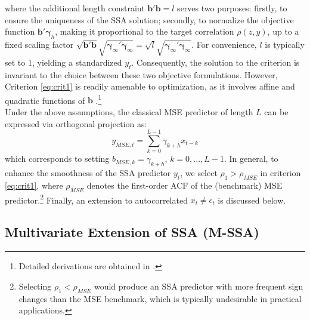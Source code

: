 \documentclass[11pt,a4paper]{article}
\begin{document}
where the additional length constraint $\mathbf{b}'\mathbf{b}=l$ serves two purposes: firstly, to ensure the uniqueness of the SSA solution; secondly, to normalize the objective function $\mathbf{b}'\boldsymbol{\gamma}_{h}$, making it proportional to the target correlation $\rho(z,y)$, up to a fixed scaling factor $\sqrt{\mathbf{b}'\mathbf{b}}\sqrt{\boldsymbol{\gamma}_{\infty}'\boldsymbol{\gamma}_{\infty}}=\sqrt{l}\sqrt{\boldsymbol{\gamma}_{\infty}'\boldsymbol{\gamma}_{\infty}}$. For convenience, $l$ is typically set to 1, yielding a standardized $y_t$. Consequently, the solution to the criterion is invariant to the choice between these two objective formulations. However, 
Criterion \eqref{eq:crit1} is readily amenable to optimization, as it involves affine and quadratic functions of $\mathbf{b}$ \citep{Wildi2024}.\footnote{Detailed derivations are obtained in \cite{Wildi2025}.} \\
Under the above assumptions, the classical MSE predictor of length $L$ can be expressed via orthogonal projection as:
\[
y_{MSE,t}=\sum_{k=0}^{L-1}\gamma_{k+h}x_{t-k}
\]
which corresponds to setting $b_{MSE,k}=\gamma_{k+h}$, $k=0,...,L-1$. In general, to enhance the smoothness of the SSA predictor $y_t$, we select $\rho_1>\rho_{MSE}$ in criterion \eqref{eq:crit1}, where $\rho_{MSE}$ denotes the first-order ACF of the (benchmark) MSE predictor.\footnote{Selecting $\rho_1<\rho_{MSE}$ would produce an SSA predictor with more frequent sign changes than the MSE benchmark, which is typically undesirable in practical applications.} Finally, an extension to autocorrelated $x_t\neq \epsilon_t$ is discussed below.
 

\subsection{Multivariate Extension of SSA (M-SSA)}
\end{document}
